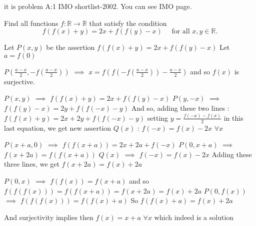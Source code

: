 


\begin{solution}
	it is problem A:1 IMO shortlist-2002. You can see IMO page.
\end{solution}



\begin{solution}
	\begin{tcolorbox}Find all functions $f : \mathbb{R} \to \mathbb{R}$ that satisfy the condition
\[f(f(x) + y) = 2x + f(f(y) - x)\quad \text{ for all } x, y \in\mathbb{R}.\]\end{tcolorbox}
Let $P(x,y)$ be the assertion $f(f(x)+y)=2x+f(f(y)-x)$
Let $a=f(0)$

$P(\frac{a-x}2,-f(\frac{a-x}2))$ $\implies$ $x=f(f(-f(\frac{a-x}2))-\frac{a-x}2)$ and so $f(x)$ is surjective.

$P(x,y)$ $\implies$ $f(f(x)+y)=2x+f(f(y)-x)$
$P(y,-x)$ $\implies$ $f(f(y)-x)=2y+f(f(-x)-y)$
And so, adding these two lines : $f(f(x)+y)=2x+2y+f(f(-x)-y)$
setting $y=\frac{f(-x)-f(x)}2$ in this last equation, we get new assertion $Q(x)$ : $f(-x)=f(x)-2x$ $\forall x$

$P(x+a,0)$ $\implies$ $f(f(x+a))=2x+2a+f(-x)$
$P(0,x+a)$ $\implies$ $f(x+2a)=f(f(x+a))$
$Q(x)$ $\implies$ $f(-x)=f(x)-2x$
Adding these three lines, we get $f(x+2a)=f(x)+2a$ 

$P(0,x)$ $\implies$ $f(f(x))=f(x+a)$ and so $f(f(f(x)))=f(f(x+a))=f(x+2a)=f(x)+2a$
$P(0,f(x))$ $\implies$ $f(f(f(x)))=f(f(x)+a)$
So $f(f(x)+a)=f(x)+2a$

And surjectivity implies then $\boxed{f(x)=x+a}$ $\forall x$ which indeed is a solution
\end{solution}



